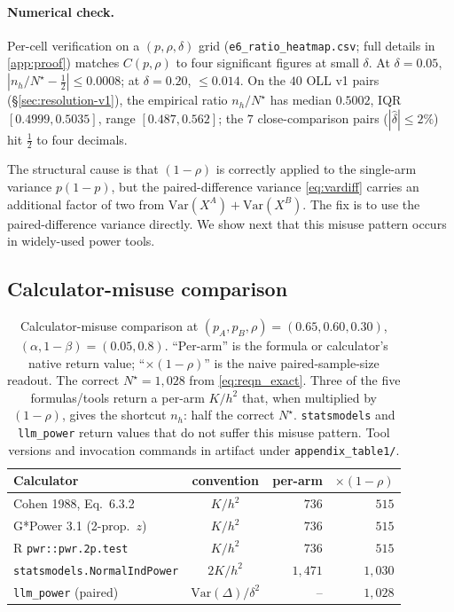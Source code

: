 \documentclass{article}
\theoremstyle{plain}
\theoremstyle{definition}
\begin{document}
\paragraph{Numerical check.} Per-cell verification on a $(p,\rho,\delta)$ grid (\texttt{e6\_ratio\_heatmap.csv}; full details in \cref{app:proof}) matches $C(p,\rho)$ to four significant figures at small $\delta$. At $\delta{=}0.05$, $|n_h/N^{\star} - \tfrac12| \leq 0.0008$; at $\delta{=}0.20$, $\leq 0.014$. On the $40$ OLL v1 pairs (\S\ref{sec:resolution-v1}), the empirical ratio $n_h/N^{\star}$ has median $0.5002$, IQR $[0.4999, 0.5035]$, range $[0.487, 0.562]$; the $7$ close-comparison pairs ($|\hat\delta|\leq 2\%$) hit $\tfrac12$ to four decimals.

The structural cause is that $(1{-}\rho)$ is correctly applied to the single-arm variance $p(1{-}p)$, but the paired-difference variance \cref{eq:vardiff} carries an additional factor of two from $\mathrm{Var}(X^A){+}\mathrm{Var}(X^B)$. The fix is to use the paired-difference variance directly. We show next that this misuse pattern occurs in widely-used power tools.

\subsection{Calculator-misuse comparison}
\label{sec:misuse}

\begin{table}[t]
\centering\footnotesize
\caption{Calculator-misuse comparison at $(p_A,p_B,\rho)=(0.65,0.60,0.30)$, $(\alpha,1{-}\beta)=(0.05,0.8)$. ``Per-arm'' is the formula or calculator's native return value; ``$\times(1{-}\rho)$'' is the naive paired-sample-size readout. The correct $N^{\star}=1{,}028$ from \cref{eq:reqn_exact}. Three of the five formulas/tools return a per-arm $K/h^2$ that, when multiplied by $(1{-}\rho)$, gives the shortcut $n_h$: half the correct $N^{\star}$. \texttt{statsmodels} and \texttt{llm\_power} return values that do not suffer this misuse pattern. Tool versions and invocation commands in artifact under \texttt{appendix\_table1/}.}
\label{tab:misuse}
\setlength{\tabcolsep}{2pt}
\scriptsize
\begin{tabular}{@{}lcrr@{}}
\toprule
Calculator & convention & per-arm & $\times(1{-}\rho)$ \\
\midrule
Cohen 1988, Eq.~6.3.2                & $K/h^2$    & $736$    & $515$ \\
G*Power 3.1 (2-prop.\ $z$)           & $K/h^2$    & $736$    & $515$ \\
R \texttt{pwr::pwr.2p.test}          & $K/h^2$    & $736$    & $515$ \\
\texttt{statsmodels.NormalIndPower}  & $2K/h^2$   & $1{,}471$ & $1{,}030$ \\
\texttt{llm\_power} (paired)         & $\mathrm{Var}(\Delta)/\delta^2$ & -- & $1{,}028$ \\
\bottomrule
\end{tabular}
\end{table}
\end{document}
